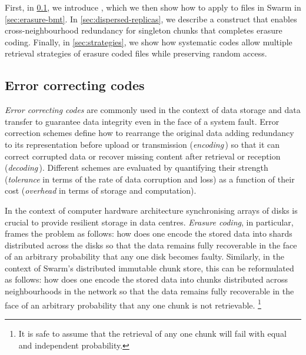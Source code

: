 First, in \ref{sec:error-correcting-codes}, we introduce , which we then show how to apply to files in Swarm in \ref{sec:erasure-bmt}. In \ref{sec:dispersed-replicas}, we describe a construct that enables cross-neighbourhood redundancy for singleton chunks that completes erasure coding. Finally, in \ref{sec:strategies}, we show how systematic codes allow multiple retrieval strategies of erasure coded files  while preserving random access.

\subsection{Error correcting codes \statusgreen}\label{sec:error-correcting-codes}
%

\emph{Error correcting codes} are commonly used in the context of data storage and data transfer to guarantee  data integrity even in the face of a system fault. Error correction schemes define how to rearrange the original data adding redundancy to its representation before upload or transmission (\emph{encoding}\,) so that it can correct corrupted data or recover missing content after retrieval or reception (\emph{decoding}\,). Different schemes are evaluated by quantifying their strength (\emph{tolerance} in terms of the rate of data corruption and loss) as a function of their cost (\emph{overhead} in terms of storage and computation). 

In the context of  computer hardware architecture synchronising arrays of disks is crucial to provide resilient storage in data centres.
\emph{Erasure coding},%
%
%
in particular, frames the problem as follows: how does one encode the stored data into shards distributed across the disks so that the data remains fully recoverable in the face of an arbitrary probability that any one disk becomes faulty.
Similarly, in the context of Swarm's distributed immutable chunk store, this can be reformulated as follows: how does one encode the stored data into chunks distributed across neighbourhoods in the network so that the data remains fully recoverable in the face of an arbitrary probability that any one chunk is not retrievable.%
%
\footnote{%
It is safe to assume that the retrieval of any one chunk will fail with equal and independent probability.}

